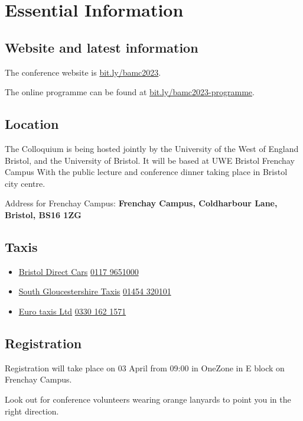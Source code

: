 \documentclass[12pt,a4paper]{article}
\begin{document}
\section{Essential Information}

\subsection{Website and latest information}

The conference website is \href{https://bit.ly/bamc2023}{bit.ly/bamc2023}.

The online programme can be found at \href{https://bit.ly/bamc2023-programme}{bit.ly/bamc2023-programme}.

\subsection{Location}

The Colloquium is being hosted jointly by the University of the West of England Bristol, and the University of Bristol. It will be based at UWE Bristol Frenchay Campus With the public lecture and conference dinner taking place in Bristol city centre.

Address for Frenchay Campus: \textbf{Frenchay Campus, Coldharbour Lane, Bristol, BS16 1ZG}

\subsection{Taxis}

\begin{itemize}
\item \href{http://www.bristoldirectcars.co.uk/}{Bristol Direct Cars} \href{tel:01179651000}{0117 9651000}
\item \href{http://www.southgloscabs.co.uk/}{South Gloucestershire Taxis} \href{tel:01454320101}{01454 320101}
\item \href{https://www.eurotaxis.com/taxis/}{Euro taxis Ltd} \href{tel:03301621571}{0330 162 1571}
\end{itemize}

\subsection{Registration}

Registration will take place on 03 April from 09:00 in OneZone in E block on Frenchay Campus.

Look out for conference volunteers wearing orange lanyards to point you in the right direction.
\end{document}
